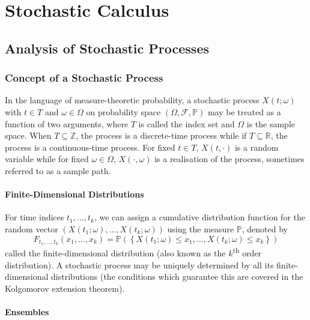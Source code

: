\documentclass[11pt]{report} %
\begin{document}
\chapter{Stochastic Calculus}

\section{Analysis of Stochastic Processes}

\subsection{Concept of a Stochastic Process \cite{Astrom1970}}

In the language of measure-theoretic probability, a stochastic process $X\left(t; \omega\right)$ with $t \in T$ and $\omega \in \Omega$ on probability space $\left(\Omega, \mathcal{F}, \mathbb{P}\right)$ may be treated as a function of two arguments, where $T$ is called the index set and $\Omega$ is the sample space. When $T \subseteq \mathbb{Z}$, the process is a discrete-time process while if $T \subseteq \mathbb{R}$, the process is a continuous-time process. For fixed $t \in T$, $X\left(t, \cdot\right)$ is a random variable while for fixed $\omega \in \Omega$, $X\left(\cdot, \omega\right)$ is a realisation of the process, sometimes referred to as a sample path.

\subsubsection{Finite-Dimensional Distributions}

For time indices $t_{1}, \dots, t_{k}$, we can assign a cumulative distribution function for the random vector $\left(X\left(t_{1}; \omega\right), \dots, X\left(t_{k}; \omega\right)\right)$ using the measure $\mathbb{P}$, denoted by
\begin{equation}
F_{t_{1}, \dots, t_{k}}\left(x_{1}, \dots, x_{k}\right) = \mathbb{P}\left(\left\{X\left(t_{1}; \omega\right) \leq x_{1}, \dots, X\left(t_{k}; \omega\right) \leq x_{k}\right\}\right)
\end{equation}
called the finite-dimensional distribution (also known as the $k$\textsuperscript{th} order distribution). A stochastic process may be uniquely determined by all its finite-dimensional distributions (the conditions which guarantee this are covered in the Kolgomorov extension theorem).

\subsubsection{Ensembles}
\end{document}
